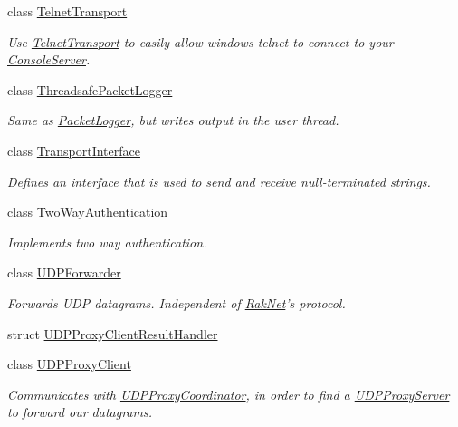 \begin{DoxyCompactItemize}
class \hyperlink{class_rak_net_1_1_telnet_transport}{Telnet\-Transport}
\begin{DoxyCompactList}\small\item\em Use \hyperlink{class_rak_net_1_1_telnet_transport}{Telnet\-Transport} to easily allow windows telnet to connect to your \hyperlink{class_rak_net_1_1_console_server}{Console\-Server}. \end{DoxyCompactList}\item 
class \hyperlink{class_rak_net_1_1_threadsafe_packet_logger}{Threadsafe\-Packet\-Logger}
\begin{DoxyCompactList}\small\item\em Same as \hyperlink{class_rak_net_1_1_packet_logger}{Packet\-Logger}, but writes output in the user thread. \end{DoxyCompactList}\item 
class \hyperlink{class_rak_net_1_1_transport_interface}{Transport\-Interface}
\begin{DoxyCompactList}\small\item\em Defines an interface that is used to send and receive null-\/terminated strings. \end{DoxyCompactList}\item 
class \hyperlink{class_rak_net_1_1_two_way_authentication}{Two\-Way\-Authentication}
\begin{DoxyCompactList}\small\item\em Implements two way authentication. \end{DoxyCompactList}\item 
class \hyperlink{class_rak_net_1_1_u_d_p_forwarder}{U\-D\-P\-Forwarder}
\begin{DoxyCompactList}\small\item\em Forwards U\-D\-P datagrams. Independent of \hyperlink{namespace_rak_net}{Rak\-Net}'s protocol. \end{DoxyCompactList}\item 
struct \hyperlink{struct_rak_net_1_1_u_d_p_proxy_client_result_handler}{U\-D\-P\-Proxy\-Client\-Result\-Handler}
\item 
class \hyperlink{class_rak_net_1_1_u_d_p_proxy_client}{U\-D\-P\-Proxy\-Client}
\begin{DoxyCompactList}\small\item\em Communicates with \hyperlink{class_rak_net_1_1_u_d_p_proxy_coordinator}{U\-D\-P\-Proxy\-Coordinator}, in order to find a \hyperlink{class_rak_net_1_1_u_d_p_proxy_server}{U\-D\-P\-Proxy\-Server} to forward our datagrams. \end{DoxyCompactList}\item 

\end{DoxyCompactItemize}
